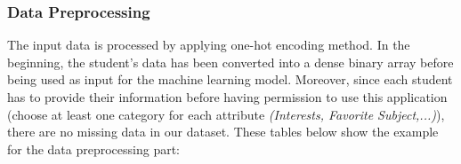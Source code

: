 \documentclass[12pt]{article}
\begin{document}
\subsubsection{Data Preprocessing}
The input data is processed by applying one-hot encoding method. In the beginning, the student's data has been converted into a dense binary array before being used as input for the machine learning model. Moreover, since each student has to provide their information before having permission to use this application (choose at least one category for each attribute \emph{(Interests, Favorite Subject,...)}), there are no missing data in our dataset. These tables below show the example for the data preprocessing part:

\begin{table}[H]
\caption{Data before preprocessing}
\label{data preprocessing}
\end{table}

\begin{table}[H]
\centering
{}
\caption{Data after preprocessing}
\label{data preprocessing}
\end{table}
\end{document}
